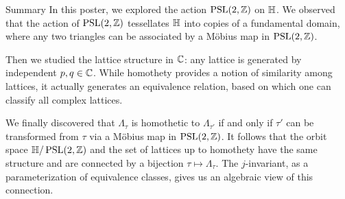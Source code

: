 \begin{hyperbolicbox}{Summary}
    In this poster, we explored the action $\operatorname{PSL}(2,\mathbb{Z})$ on $\mathbb{H}$. We observed that the action of $\operatorname{PSL}(2,\mathbb{Z})$ tessellates $\mathbb{H}$ into copies of a fundamental domain, where any two triangles can be associated by a M\"obius map in $\operatorname{PSL}(2,\mathbb{Z})$.

    Then we studied the lattice structure in $\mathbb{C}$: any lattice is generated by independent $p,q\in\mathbb{C}$. While homothety provides a notion of similarity among lattices, it actually generates an equivalence relation, based on which one can classify all complex lattices.

    We finally discovered that $\Lambda_\tau$ is homothetic to $\Lambda_{\tau'}$ if and only if $\tau'$ can be transformed from $\tau$ via a M\"obius map in $\operatorname{PSL}(2,\mathbb{Z})$. It follows that the orbit space $\mathbb{H}/\operatorname{PSL}(2,\mathbb{Z})$ and the set of lattices up to homothety have the same structure and are connected by a bijection $\tau\mapsto\Lambda_\tau$. The $j$-invariant, as a parameterization of equivalence classes, gives us an algebraic view of this connection.
\end{hyperbolicbox}